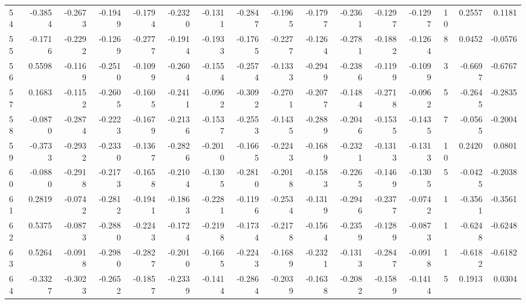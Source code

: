 \begin{tabular}{lrrrrrrrrrrrrrrr}
54  &     -0.3854 & -0.2673 & -0.1949 & -0.1794 & -0.2320 & -0.1311 & -0.2847 & -0.1965 & -0.1797 & -0.2361 &  -0.1297 &    -0.1297 &     10 &                    0.2557 &                     0.1181 \\
55  &     -0.1716 & -0.2292 & -0.1269 & -0.2777 & -0.1914 & -0.1933 & -0.1765 & -0.2277 & -0.1264 & -0.2781 &  -0.1882 &    -0.1264 &      8 &                    0.0452 &                    -0.0576 \\
56  &      0.5598 & -0.1169 & -0.2510 & -0.1099 & -0.2604 & -0.1554 & -0.2574 & -0.1333 & -0.2949 & -0.2386 &  -0.1199 &    -0.1099 &      3 &                   -0.6697 &                    -0.6767 \\
57  &      0.1683 & -0.1152 & -0.2605 & -0.1605 & -0.2411 & -0.0962 & -0.3092 & -0.2701 & -0.2077 & -0.1484 &  -0.2718 &    -0.0962 &      5 &                   -0.2645 &                    -0.2835 \\
58  &     -0.0870 & -0.2874 & -0.2223 & -0.1679 & -0.2136 & -0.1537 & -0.2553 & -0.1435 & -0.2889 & -0.2046 &  -0.1535 &    -0.1435 &      7 &                   -0.0565 &                    -0.2004 \\
59  &     -0.3733 & -0.2932 & -0.2330 & -0.1367 & -0.2826 & -0.2010 & -0.1665 & -0.2243 & -0.1689 & -0.2321 &  -0.1313 &    -0.1313 &     10 &                    0.2420 &                     0.0801 \\
60  &     -0.0880 & -0.2918 & -0.2173 & -0.1658 & -0.2104 & -0.1305 & -0.2810 & -0.2018 & -0.1583 & -0.2265 &  -0.1469 &    -0.1305 &      5 &                   -0.0425 &                    -0.2038 \\
61  &      0.2819 & -0.0742 & -0.2812 & -0.1941 & -0.1863 & -0.2281 & -0.1196 & -0.2534 & -0.1319 & -0.2946 &  -0.2377 &    -0.0742 &      1 &                   -0.3561 &                    -0.3561 \\
62  &      0.5375 & -0.0873 & -0.2880 & -0.2243 & -0.1724 & -0.2198 & -0.1734 & -0.2178 & -0.1564 & -0.2359 &  -0.1289 &    -0.0873 &      1 &                   -0.6248 &                    -0.6248 \\
63  &      0.5264 & -0.0918 & -0.2980 & -0.2827 & -0.2010 & -0.1665 & -0.2243 & -0.1689 & -0.2321 & -0.1313 &  -0.2847 &    -0.0918 &      1 &                   -0.6182 &                    -0.6182 \\
64  &     -0.3327 & -0.3023 & -0.2652 & -0.1857 & -0.2339 & -0.1414 & -0.2864 & -0.2039 & -0.1638 & -0.2082 &  -0.1589 &    -0.1414 &      5 &                    0.1913 &                     0.0304 \\

\end{tabular}

